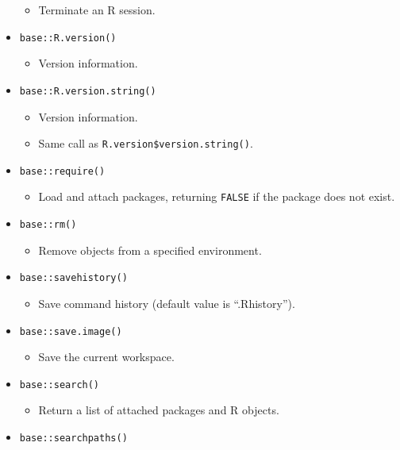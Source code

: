 \documentclass[
]{book}
\providecommand{\tightlist}{%
  \setlength{\itemsep}{0pt}\setlength{\parskip}{0pt}}
\begin{document}
\begin{itemize}
  \begin{itemize}
  \tightlist
  \item
    Terminate an R session.
  \end{itemize}
\item
  \texttt{base::R.version()}

  \begin{itemize}
  \tightlist
  \item
    Version information.
  \end{itemize}
\item
  \texttt{base::R.version.string()}

  \begin{itemize}
  \tightlist
  \item
    Version information.
  \item
    Same call as \texttt{R.version\$version.string()}.
  \end{itemize}
\item
  \texttt{base::require()}

  \begin{itemize}
  \tightlist
  \item
    Load and attach packages, returning \texttt{FALSE} if the package does not exist.
  \end{itemize}
\item
  \texttt{base::rm()}

  \begin{itemize}
  \tightlist
  \item
    Remove objects from a specified environment.
  \end{itemize}
\item
  \texttt{base::savehistory()}

  \begin{itemize}
  \tightlist
  \item
    Save command history (default value is ``.Rhistory'').
  \end{itemize}
\item
  \texttt{base::save.image()}

  \begin{itemize}
  \tightlist
  \item
    Save the current workspace.
  \end{itemize}
\item
  \texttt{base::search()}

  \begin{itemize}
  \tightlist
  \item
    Return a list of attached packages and R objects.
  \end{itemize}
\item
  \texttt{base::searchpaths()}


\end{itemize}
\end{document}
